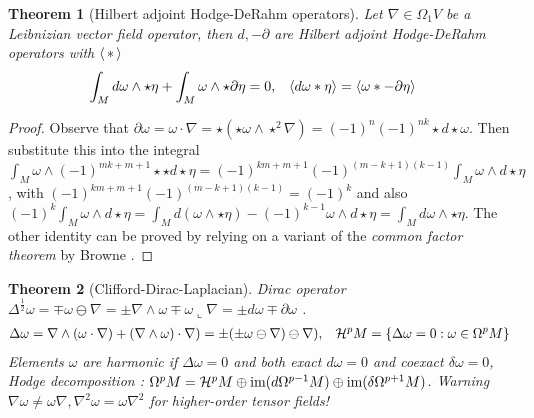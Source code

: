 \documentclass[]{article}
\newtheorem{theorem}{Theorem}
\theoremstyle{definition}
\theoremstyle{remark}
\begin{document}
\begin{theorem}[Hilbert adjoint Hodge-DeRahm operators]
	Let $ \nabla \in\Omega_1 V $ be a Leibnizian vector field operator, then $d,-\partial$ are Hilbert adjoint Hodge-DeRahm operators with $\left\langle \,\ast\, \right\rangle$
	\begin{align*}
		\int_M d\omega\wedge\star\eta +\int_M \omega\wedge\star\partial\eta &= 0, & \left\langle d\omega\ast\eta \right\rangle &=\left\langle \omega\ast-\partial\eta \right\rangle
	\end{align*}
\end{theorem}
\begin{proof}
	Observe that $\partial\omega = \omega\cdot\nabla = \star(\star\omega\wedge\star^2\nabla) = (-1)^n(-1)^{nk}\star d\star\omega$.
	Then  substitute this into the integral $\int_M \omega\wedge(-1)^{mk+m+1}\star\star d\star\eta = (-1)^{km+m+1}(-1)^{(m-k+1)(k-1)}\int_M\omega\wedge d\star\eta$,
	with $(-1)^{km+m+1}(-1)^{(m-k+1)(k-1)}=(-1)^k$ and also
	$ (-1)^k\int_M\omega\wedge d\star\eta = \int_M d(\omega\wedge\star\eta) - (-1)^{k-1}\omega\wedge d\star\eta = \int_M d\omega\wedge\star\eta$.
	The other identity can be proved by relying on a variant of the \textit{common factor theorem} by Browne \cite{browne}.
\end{proof}
\begin{theorem}[Clifford-Dirac-Laplacian]
	Dirac operator $ \Delta^\frac12\omega = \mp\omega\ominus\nabla = \pm\nabla\wedge\omega \mp \omega\llcorner\nabla  = \pm d\omega\mp\partial\omega$ \cite{garling}.
	\begin{align*}
		\Delta\omega &= \nabla\wedge(\omega\cdot\nabla) + (\nabla\wedge\omega)\cdot\nabla) = \pm(\pm\omega\ominus\nabla)\ominus\nabla), & \mathcal{H}^p M = \left\{ \Delta\omega = 0 : \omega\in \Omega^pM \right\}
	\end{align*}
	Elements $\omega$ are \textit{harmonic} if $\Delta\omega = 0$ and both \textit{exact} $d\omega=0$ and \textit{coexact} $\delta\omega=0$, Hodge decomposition \cite{ivancevic}:
	$\Omega^pM=\mathcal{H}^pM\oplus\text{im}(d\Omega^{p-1}M)\oplus\text{im}(\delta\Omega^{p+1}M)$.
	Warning $\nabla\omega\neq\omega\nabla, \nabla^2\omega=\omega\nabla^2$ for higher-order tensor fields!
\end{theorem}

\end{document}
